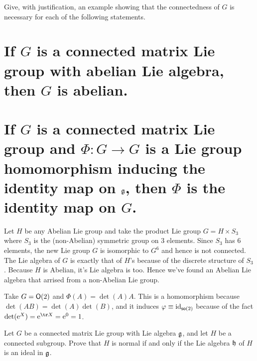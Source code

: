 \documentclass[
	pages,
	boxes,
	color=WildStrawberry
]{homework}
\begin{document}
\begin{problem}
Give, with justification, an example showing that the connectedness of $G$ is necessary for each of the following statements.
\begin{parts}
	\part{If $G$ is a connected matrix Lie group with abelian Lie algebra, then $G$ is abelian.}\label{part:4a}
	\part{If $G$ is a connected matrix Lie group and $\Phi: G \to G$ is a Lie group homomorphism inducing the identity map on $\mathfrak{g}$, then $\Phi$ is the identity map on $G$.}\label{part:4b}
\end{parts}
\end{problem}

\begin{solution}
	\ref{part:4a}
	Let $H$ be any Abelian Lie group and take the product Lie group $G = H\times S_3$ where $S_3$ is the (non-Abelian) symmetric group on 3 elements. Since $S_3$ has 6 elements, the new Lie group $G$ is isomorphic to $G^6$ and hence is not connected. The Lie algebra of $G$ is exactly that of $H$'s because of the discrete structure of $S_3$. Because $H$ is Abelian, it's Lie algebra is too. Hence we've found an Abelian Lie algebra that arrised from a non-Abelian Lie group.

	\ref{part:4b}
	Take $G = \mathsf{O}(2)$ and $\Phi(A) = \det(A)A$. This is a homomorphism because $\det(AB) = \det(A)\det(B)$, and it induces $\varphi\equiv\operatorname{id}_{\mathsf{so}(2)}$ because of the fact $\det(\e^{X}) = \e^{\tr X} = \e^0 = 1$.
\end{solution}

\begin{problem}
Let $G$ be a connected matrix Lie group with Lie algebra $\mathfrak{g}$, and let $H$ be a connected subgroup. Prove that $H$ is normal if and only if the Lie algebra $\mathfrak{h}$ of $H$ is an ideal in $\mathfrak{g}$.
\end{problem}
\end{document}
